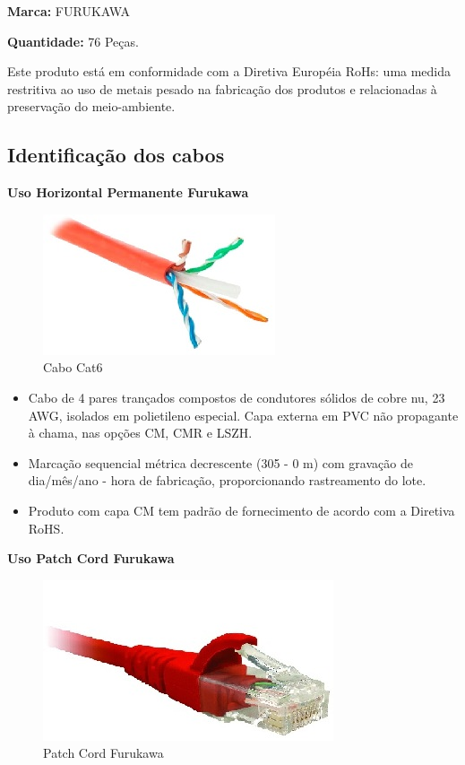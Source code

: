 \documentclass[	DIV=calc,%
							paper=a4,%
							fontsize=12pt,%
							onecolumn]{scrartcl}	 					%
\begin{document}
\textbf{Marca:} FURUKAWA

\textbf{Quantidade:} 76 Peças.

Este produto está em conformidade com a Diretiva Européia RoHs: uma medida restritiva ao uso de metais pesado na fabricação dos produtos e relacionadas à preservação do meio-ambiente.

\subsection{Identificação dos cabos}

\textbf{Uso Horizontal Permanente Furukawa}

\begin{figure}[!h]
	\centering
	\caption{Cabo Cat6}
	\includegraphics{cabo_cat6_1}
\end{figure}

\begin{itemize}
	\item Cabo de 4 pares trançados compostos de condutores sólidos de cobre nu, 23 AWG, isolados em polietileno especial. Capa externa em PVC não propagante à chama, nas opções CM, CMR e LSZH.
	\item Marcação sequencial métrica decrescente (305 - 0 m) com gravação de dia/mês/ano - hora de fabricação, proporcionando rastreamento do lote.
	\item Produto com capa CM tem padrão de fornecimento de acordo com a Diretiva RoHS.
\end{itemize}

\textbf{Uso Patch Cord Furukawa}

\begin{figure}[!h]
	\centering
	\caption{Patch Cord Furukawa}
	\includegraphics{patch_cord_cat6_1}
\end{figure}
\end{document}
